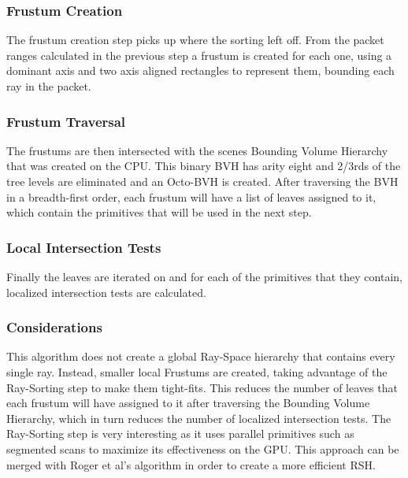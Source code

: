\subsubsection{Frustum Creation}

The frustum creation step picks up where the sorting left off. From the packet ranges calculated in the previous step a frustum is created for each one, using a dominant axis and two axis aligned rectangles to represent them, bounding each ray in the packet.

\subsubsection{Frustum Traversal}

The frustums are then intersected with the scenes Bounding Volume Hierarchy that was created on the CPU. This binary BVH has arity eight and 2/3rds of the tree levels are eliminated and an Octo-BVH is created. After traversing the BVH in a breadth-first order, each frustum will have a list of leaves assigned to it, which contain the primitives that will be used in the next step.

\subsubsection{Local Intersection Tests}

Finally the leaves are iterated on and for each of the primitives that they contain, localized intersection tests are calculated.

\subsubsection{Considerations}

This algorithm does not create a global Ray-Space hierarchy that contains every single ray. Instead, smaller local Frustums are created, taking advantage of the Ray-Sorting step to make them tight-fits. This reduces the number of leaves that each frustum will have assigned to it after traversing the Bounding Volume Hierarchy, which in turn reduces the number of localized intersection tests. The Ray-Sorting step is very interesting as it uses parallel primitives such as segmented scans to maximize its effectiveness on the GPU. This approach can be merged with Roger et al's \cite{Roger07} algorithm in order to create a more efficient RSH.